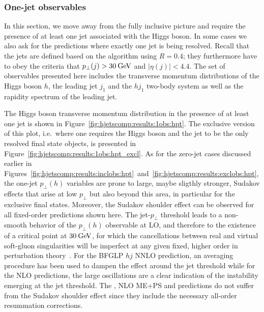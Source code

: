 \subsubsection{One-jet observables}
\label{sec:hjetscomp:results:1jobs}

In this section, we move away from the fully inclusive picture and
require the presence of at least one jet associated with the Higgs
boson. In some cases we also ask for the predictions where exactly one
jet is being resolved. Recall that the jets are defined based on the
\antikt algorithm using $R=0.4$; they furthermore have to obey the
criteria that $p_\perp(j)>30\text{\:GeV}$ and $|\eta(j)|<4.4$. The set of
observables presented here includes the transverse momentum
distributions of the Higgs boson $h$, the leading jet $j_1$ and the
$hj_1$ two-body system as well as the rapidity spectrum of the leading
jet.

The Higgs boson transverse momentum distribution in the presence of at
least one jet is shown in
Figure~\ref{fig:hjetscomp:results:1obs:hpt}. The exclusive version of
this plot, i.e.~where one requires the Higgs boson and the jet to be 
the only resolved final state objects,
is presented in Figure~\ref{fig:hjetscomp:results:1obs:hpt_excl}. As
for the zero-jet cases discussed earlier in
Figures~\ref{fig:hjetscomp:results:inclobs:hpt}~and~\ref{fig:hjetscomp:results:exclobs:hpt},
the one-jet $p_\perp(h)$ variables are prone to large, maybe sligthly
stronger, Sudakov effects that arise at low $p_\perp$ but also beyond
this area, in particular for the exclusive final states. Moreover, the
Sudakov shoulder effect can be observed for all fixed-order
predictions shown here. The jet-$p_\perp$ threshold leads to a
non-smooth behavior of the $p_\perp(h)$ observable at LO, and
therefore to the existence of a critical point at $30\text{\:GeV}$, for which
the cancellations between real and virtual soft-gluon singularities
will be imperfect at any given fixed, higher order in perturbation
theory~\cite{Catani:1997xc}. For the BFGLP $hj$ NNLO  prediction, an
averaging procedure has been used to dampen the effect around the jet
threshold while for the NLO predictions, the large oscillations are a
clear indication of the instability emerging at the jet threshold. The
\NNLOPS, NLO ME+PS and \Resbos predictions do not suffer from
the Sudakov shoulder effect since they include the necessary all-order
resummation corrections.

